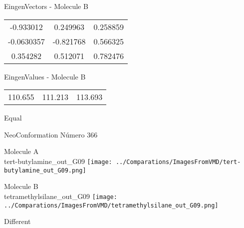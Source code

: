 \begin{multicols}{2}
\begin{center}
\vtab
 EingenVectors - Molecule B     \\
\vtab
\begin{tabular}{|c c c|}
-0.933012	 & 	0.249963	 & 	0.258859	 \\
-0.0630357	 & 	-0.821768	 & 	0.566325	 \\
0.354282	 & 	0.512071	 & 	0.782476
\end{tabular}

\vtab
 EingenValues - Molecule B     \\
\vtab
\begin{tabular}{|c c c|}
110.655	 & 	111.213	 & 	113.693	 \\
\end{tabular}

\end{center}
\end{multicols}
\begin{center}
\vtab
\vtab
\textcolor{NavyBlue}{\Large Equal}
\end{center}

 \newpage

\vtab[-2cm]
\begin{center}
{\large NeoConformation \tab Número 366}
\end{center}
\begin{multicols}{2}
\begin{center}
Molecule A \\ 
tert-butylamine\_out\_G09
\texttt{[image: ../Comparations/ImagesFromVMD/tert-butylamine\_out\_G09.png]}
\\
\vtab

\columnbreak
Molecule B \\ 
tetramethylsilane\_out\_G09
\texttt{[image: ../Comparations/ImagesFromVMD/tetramethylsilane\_out\_G09.png]}
\\
\vtab


\end{center}
\end{multicols}
\begin{center}
\vtab
\vtab
\textcolor{NavyBlue}{\Large Different}
\end{center}

 \newpage


